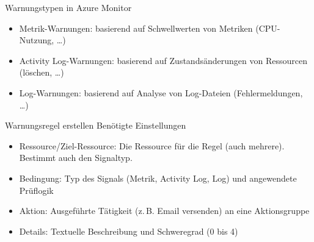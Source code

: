 
\begin{flashcard}[Definition]{Warnungstypen in Azure Monitor}
    \begin{itemize}
        \item Metrik-Warnungen:\newline
            basierend auf Schwellwerten von Metriken (CPU-Nutzung, \ldots)
        \item Activity Log-Warnungen:\newline
            basierend auf Zustandsänderungen von Ressourcen (löschen, \ldots)
        \item Log-Warnungen:\newline
            basierend auf Analyse von Log-Dateien (Fehlermeldungen, \ldots)
    \end{itemize}
\end{flashcard}

\begin{flashcard}[Definition]{Warnungsregel erstellen}
    Benötigte Einstellungen
    \begin{itemize}
        \item Ressource/Ziel-Ressource:\newline
            Die Ressource für die Regel (auch mehrere). Bestimmt auch den Signaltyp.
        \item Bedingung:\newline
            Typ des Signals (Metrik, Activity Log, Log) und angewendete Prüflogik
        \item Aktion:\newline
            Ausgeführte Tätigkeit (z.\,B. Email versenden) an eine Aktionsgruppe
        \item Details:\newline
            Textuelle Beschreibung und Schweregrad (0 bis 4)
    \end{itemize}
    \vspace{1cm}
\end{flashcard}

